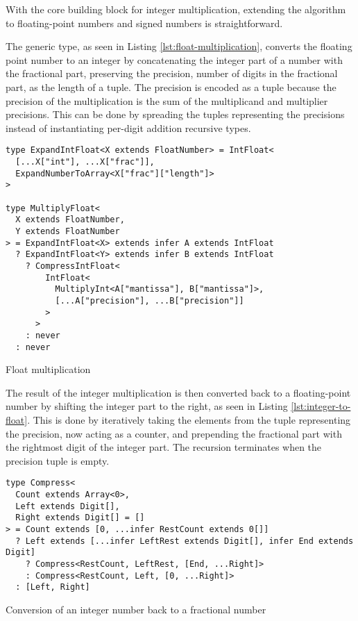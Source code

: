 With the core building block for integer multiplication, extending the algorithm to floating-point numbers and signed numbers is straightforward.

The  generic type, as seen in Listing \ref{lst:float-multiplication}, converts the floating point number to an integer by concatenating the integer part of a number with the fractional part, preserving the precision, number of digits in the fractional part, as the length of a tuple. The precision is encoded as a tuple because the precision of the multiplication is the sum of the multiplicand and multiplier precisions. This can be done by spreading the tuples representing the precisions instead of instantiating per-digit addition recursive types.

\begin{listing}[ht]
  \begin{verbatim}
type ExpandIntFloat<X extends FloatNumber> = IntFloat<
  [...X["int"], ...X["frac"]],
  ExpandNumberToArray<X["frac"]["length"]>
>

type MultiplyFloat<
  X extends FloatNumber,
  Y extends FloatNumber
> = ExpandIntFloat<X> extends infer A extends IntFloat
  ? ExpandIntFloat<Y> extends infer B extends IntFloat
    ? CompressIntFloat<
        IntFloat<
          MultiplyInt<A["mantissa"], B["mantissa"]>,
          [...A["precision"], ...B["precision"]]
        >
      >
    : never
  : never
\end{verbatim}
  \caption{Float multiplication}\label{lst:float-multiplication}
\end{listing}

The result of the integer multiplication is then converted back to a floating-point number by shifting the integer part to the right, as seen in Listing \ref{lst:integer-to-float}. This is done by iteratively taking the elements from the tuple representing the precision, now acting as a counter, and prepending the fractional part with the rightmost digit of the integer part. The recursion terminates when the precision tuple is empty.

\begin{listing}[ht]
  \begin{verbatim}
type Compress<
  Count extends Array<0>,
  Left extends Digit[],
  Right extends Digit[] = []
> = Count extends [0, ...infer RestCount extends 0[]]
  ? Left extends [...infer LeftRest extends Digit[], infer End extends Digit]
    ? Compress<RestCount, LeftRest, [End, ...Right]>
    : Compress<RestCount, Left, [0, ...Right]>
  : [Left, Right]
\end{verbatim}
  \caption{Conversion of an integer number back to a fractional number}\label{lst:integer-to-float}
\end{listing}

